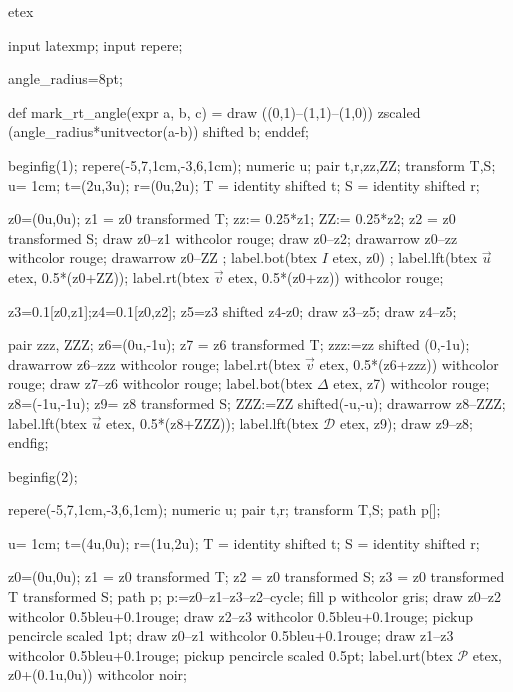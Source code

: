 \documentclass[12pt]{article}
\begin{document}
 
etex 

input latexmp;
input repere;


angle_radius=8pt;
 
def mark_rt_angle(expr a, b, c) =
  draw ((0,1)--(1,1)--(1,0))
       zscaled (angle_radius*unitvector(a-b)) shifted b;
enddef;

beginfig(1);
repere(-5,7,1cm,-3,6,1cm); 
 numeric u;
 pair t,r,zz,ZZ;
 transform T,S;
 u= 1cm;
 t=(2u,3u); r=(0u,2u);
 T = identity shifted t;
 S = identity shifted r;

 z0=(0u,0u);
 z1 = z0 transformed T;
 zz:= 0.25*z1;
 ZZ:= 0.25*z2;
 z2 = z0 transformed S;
 draw z0--z1 withcolor rouge;
 draw z0--z2;
 drawarrow z0--zz withcolor rouge;
 drawarrow z0--ZZ ;
 label.bot(btex $I$ etex, z0) ;
 label.lft(btex $\overrightarrow{u}$ etex, 0.5*(z0+ZZ));
 label.rt(btex $\overrightarrow{v}$ etex, 0.5*(z0+zz)) withcolor rouge;





 z3=0.1[z0,z1];z4=0.1[z0,z2];
 z5=z3 shifted z4-z0;
 draw z3--z5;
 draw z4--z5;

 pair zzz, ZZZ;
 z6=(0u,-1u);
 z7 = z6 transformed T;
 zzz:=zz shifted (0,-1u);
 drawarrow z6--zzz withcolor rouge;
 label.rt(btex $\overrightarrow{v}$ etex, 0.5*(z6+zzz)) withcolor rouge;
 draw z7--z6 withcolor rouge;
 label.bot(btex $\Delta$ etex, z7) withcolor rouge;
z8=(-1u,-1u);
z9= z8 transformed S;
ZZZ:=ZZ shifted(-u,-u);
drawarrow z8--ZZZ;
label.lft(btex $\overrightarrow{u}$ etex, 0.5*(z8+ZZZ));
label.lft(btex $\mathscr{D}$ etex, z9);
draw z9--z8;
endfig;

beginfig(2);

repere(-5,7,1cm,-3,6,1cm); 
numeric u;
pair t,r;
transform T,S;
path p[];

u= 1cm;
t=(4u,0u); r=(1u,2u);
T = identity shifted t;
S = identity shifted r;

 z0=(0u,0u);
 z1 = z0 transformed T;
 z2 = z0 transformed S;
 z3 = z0 transformed T transformed S;
 path p;
 p:=z0--z1--z3--z2--cycle;
 fill p withcolor gris;
 draw z0--z2 withcolor 0.5bleu+0.1rouge;
 draw z2--z3 withcolor 0.5bleu+0.1rouge;
pickup pencircle scaled 1pt;
draw z0--z1 withcolor 0.5bleu+0.1rouge;
draw z1--z3 withcolor 0.5bleu+0.1rouge;
pickup pencircle scaled 0.5pt;
label.urt(btex $\mathscr{P}$ etex, z0+(0.1u,0u)) withcolor noir;
\end{document}
